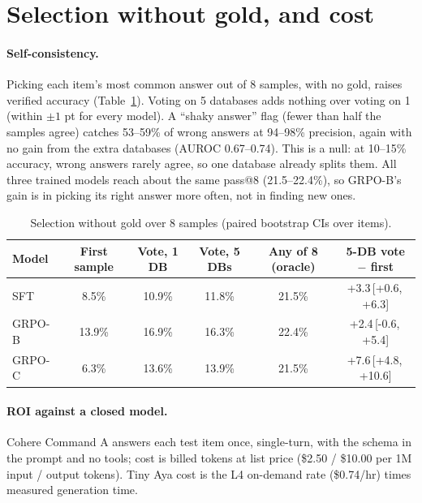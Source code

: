 \documentclass{article}
\newcommand{\ci}[2]{\,[#1,\,#2]}
\begin{document}
\section{Selection without gold, and cost}
\label{sec:e8}

\paragraph{Self-consistency.} Picking each item's most common answer out of 8 samples, with no gold, raises verified accuracy (Table~\ref{tab:e8}). Voting on 5 databases adds nothing over voting on 1 (within $\pm1$ pt for every model). A ``shaky answer'' flag (fewer than half the samples agree) catches 53--59\% of wrong answers at 94--98\% precision, again with no gain from the extra databases (AUROC 0.67--0.74). This is a null: at 10--15\% accuracy, wrong answers rarely agree, so one database already splits them. All three trained models reach about the same pass@8 (21.5--22.4\%), so GRPO-B's gain is in picking its right answer more often, not in finding new ones.

\begin{table}[t]
\caption{Selection without gold over 8 samples (paired bootstrap CIs over items).}
\label{tab:e8}
\centering\small
\begin{tabular}{lccccc}
\toprule
Model & First sample & Vote, 1 DB & Vote, 5 DBs & Any of 8 (oracle) & 5-DB vote $-$ first\\
\midrule
SFT & 8.5\% & 10.9\% & 11.8\% & 21.5\% & +3.3\ci{+0.6}{+6.3}\\
GRPO-B & 13.9\% & 16.9\% & 16.3\% & 22.4\% & +2.4\ci{-0.6}{+5.4}\\
GRPO-C & 6.3\% & 13.6\% & 13.9\% & 21.5\% & +7.6\ci{+4.8}{+10.6}\\
\bottomrule
\end{tabular}
\end{table}

\paragraph{ROI against a closed model.} Cohere Command A answers each test item once, single-turn, with the schema in the prompt and no tools; cost is billed tokens at list price (\$2.50 / \$10.00 per 1M input / output tokens). Tiny Aya cost is the L4 on-demand rate (\$0.74/hr) times measured generation time.
\end{document}
